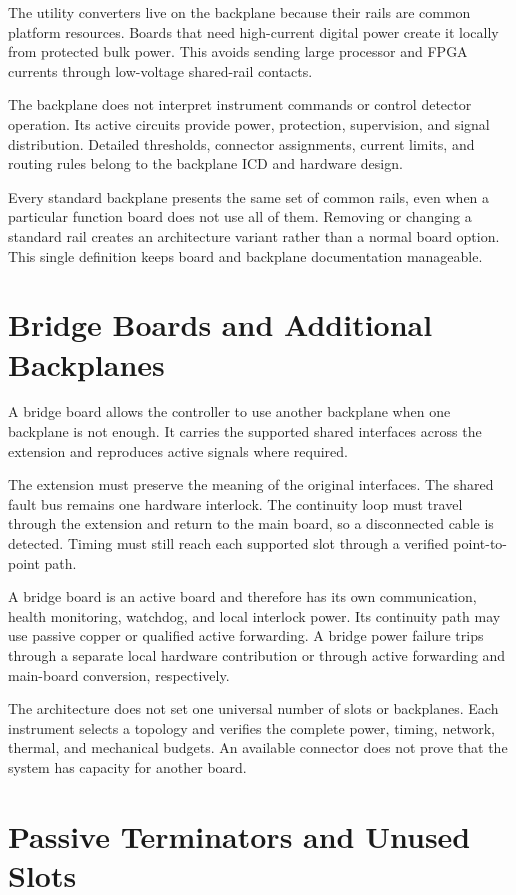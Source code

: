 The utility converters live on the backplane because their rails are common platform resources. Boards that need high-current digital power create it locally from protected bulk power. This avoids sending large processor and FPGA currents through low-voltage shared-rail contacts.

The backplane does not interpret instrument commands or control detector operation. Its active circuits provide power, protection, supervision, and signal distribution. Detailed thresholds, connector assignments, current limits, and routing rules belong to the backplane ICD and hardware design.

Every standard backplane presents the same set of common rails, even when a particular function board does not use all of them. Removing or changing a standard rail creates an architecture variant rather than a normal board option. This single definition keeps board and backplane documentation manageable.

\section{Bridge Boards and Additional Backplanes}

A bridge board allows the controller to use another backplane when one backplane is not enough. It carries the supported shared interfaces across the extension and reproduces active signals where required.

The extension must preserve the meaning of the original interfaces. The shared fault bus remains one hardware interlock. The continuity loop must travel through the extension and return to the main board, so a disconnected cable is detected. Timing must still reach each supported slot through a verified point-to-point path.

A bridge board is an active board and therefore has its own communication, health monitoring, watchdog, and local interlock power. Its continuity path may use passive copper or qualified active forwarding. A bridge power failure trips through a separate local hardware contribution or through active forwarding and main-board conversion, respectively.

The architecture does not set one universal number of slots or backplanes. Each instrument selects a topology and verifies the complete power, timing, network, thermal, and mechanical budgets. An available connector does not prove that the system has capacity for another board.

\section{Passive Terminators and Unused Slots}

